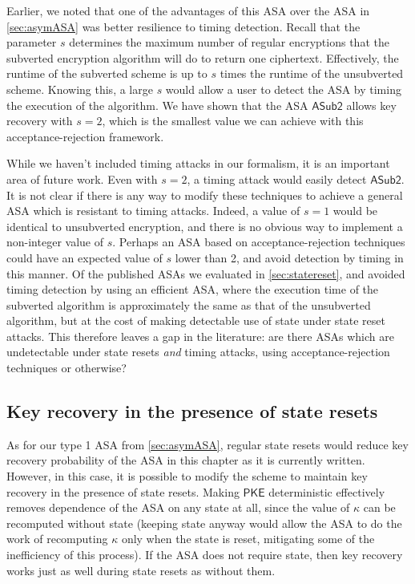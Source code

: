 Earlier, we noted that one of the advantages of this ASA over the ASA in \autoref{sec:asymASA} was better resilience to timing detection. Recall that the parameter $s$ determines the maximum number of regular encryptions that the subverted encryption algorithm will do to return one ciphertext. Effectively, the runtime of the subverted scheme is up to $s$ times the runtime of the unsubverted scheme. Knowing this, a large $s$ would allow a user to detect the ASA by timing the execution of the algorithm. We have shown that the ASA $\mathsf{ASub2}$ allows key recovery with $s=2$, which is the smallest value we can achieve with this acceptance-rejection framework.

While we haven't included timing attacks in our formalism, it is an important area of future work. Even with $s=2$, a timing attack would easily detect $\mathsf{ASub2}$. It is not clear if there is any way to modify these techniques to achieve a general ASA which is resistant to timing attacks. Indeed, a value of $s=1$ would be identical to unsubverted encryption, and there is no obvious way to implement a non-integer value of $s$. Perhaps an ASA based on acceptance-rejection techniques could have an expected value of $s$ lower than 2, and avoid detection by timing in this manner. Of the published ASAs we evaluated in \autoref{sec:statereset}, \cite{BSKC2019} and \cite{AC:CheHuaYun20} avoided timing detection by using an efficient ASA, where the execution time of the subverted algorithm is approximately the same as that of the unsubverted algorithm, but at the cost of making detectable use of state under state reset attacks. This therefore leaves a gap in the literature: are there ASAs which are undetectable under state resets \emph{and} timing attacks, using acceptance-rejection techniques or otherwise?

\subsection{Key recovery in the presence of state resets}
As for our type 1 ASA from \autoref{sec:asymASA}, regular state resets would reduce key recovery probability of the ASA in this chapter as it is currently written. However, in this case, it is possible to modify the scheme to maintain key recovery in the presence of state resets. Making $\textsf{PKE}$ deterministic effectively removes dependence of the ASA on any state at all, since the value of $\kappa$ can be recomputed without state (keeping state anyway would allow the ASA to do the work of recomputing $\kappa$ only when the state is reset, mitigating some of the inefficiency of this process). If the ASA does not require state, then key recovery works just as well during state resets as without them.

